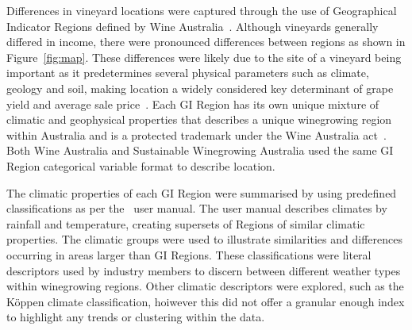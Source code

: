 \documentclass[10pt,letterpaper]{article}
\begin{document}
\par
Differences in vineyard locations were captured through the use of Geographical Indicator Regions defined by Wine Australia~\cite{hallidayAustralianWineEncyclopedia2009,oliverReviewSoilPhysical2013,soarClimateDriversRed2008}. Although vineyards generally differed in income, there were pronounced differences between regions as shown in Figure~\ref{fig:map}. These differences were likely due to the site of a vineyard being important as it predetermines several physical parameters such as climate, geology and soil, making location a widely considered key determinant of grape yield and average sale price~\cite{abbalDecisionSupportSystem2016,agostaRegionalClimateVariability2012,fragaMultivariateClusteringViticultural2017}. Each GI Region has its own unique mixture of climatic and geophysical properties that describes a unique winegrowing region within Australia and is a protected trademark under the Wine Australia act~\cite{attorney-generalsdepartmentWineAustraliaCorporation2010}. Both Wine Australia and Sustainable Winegrowing Australia used the same GI Region categorical variable format to describe location.
\par
 The climatic properties of each GI Region were summarised by using predefined classifications as per the~\cite{sustainablewinegrowingaustraliaSustainableWinegrowingAustralia2021} user manual. The user manual describes climates by rainfall and temperature, creating supersets of Regions of similar climatic properties. The climatic groups were used to illustrate similarities and differences occurring in areas larger than GI Regions.
These classifications were literal descriptors used by industry members to discern between different weather types within winegrowing regions. Other climatic descriptors were explored, such as the  Köppen climate classification, hoiwever this did not offer a granular enough index to highlight any trends or clustering within the data.
\par
\end{document}
